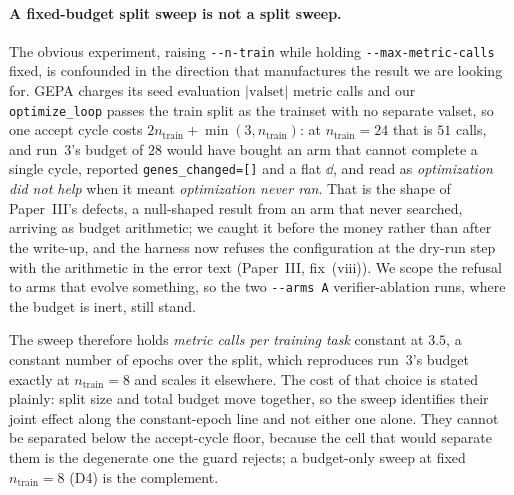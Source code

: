 \documentclass[11pt]{article}
\begin{document}
\paragraph{A fixed-budget split sweep is not a split sweep.} The obvious experiment, raising
\texttt{-{}-n-train} while holding \texttt{-{}-max-metric-calls} fixed, is confounded in the
direction that manufactures the result we are looking for. GEPA charges its seed evaluation
$|\mathrm{valset}|$ metric calls and our \texttt{optimize\_loop} passes the train split as the
trainset with no separate valset, so one accept cycle costs
$2n_{\mathrm{train}} + \min(3, n_{\mathrm{train}})$: at $n_{\mathrm{train}}{=}24$ that is $51$
calls, and run~3's budget of $28$ would have bought an arm that cannot complete a single cycle,
reported \texttt{genes\_changed=[]} and a flat $\dd$, and read as \emph{optimization did not help}
when it meant \emph{optimization never ran}. That is the shape of Paper~III's defects, a
null-shaped result from an arm that never searched, arriving as budget arithmetic; we
caught it before the money rather than after the write-up, and the harness now refuses the
configuration at the dry-run step with the arithmetic in the error text (Paper~III, fix~(viii)).
We scope the refusal to arms that evolve something, so the two \texttt{-{}-arms A}
verifier-ablation runs, where the budget
is inert, still stand.

The sweep therefore holds \emph{metric calls per training task} constant at $3.5$, a
constant number of epochs over the split, which reproduces run~3's budget exactly at
$n_{\mathrm{train}}{=}8$ and scales it elsewhere. The cost of that choice is stated plainly:
split size and total budget move together, so the sweep identifies their joint effect along
the constant-epoch line and not either one alone. They cannot be separated below the
accept-cycle floor, because the cell that would separate them is the degenerate one the guard
rejects; a budget-only sweep at fixed $n_{\mathrm{train}}{=}8$ (D4) is the complement.
\end{document}
